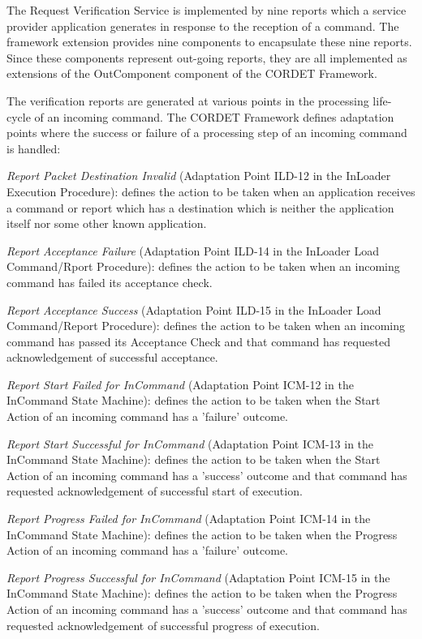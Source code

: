 \documentclass[a4paper,10pt]{article}
\newenvironment{fw_enumerate}					%
{\begin{enumerate}
  \setlength{\itemsep}{1mm}
  \setlength{\parskip}{0pt}
  \setlength{\parsep}{0pt}}
{\end{enumerate}}
\begin{document}
The Request Verification Service is implemented by nine reports which a service provider application generates in response to the reception of a command. The framework extension provides nine components to encapsulate these nine reports. Since these components represent out-going reports, they are all implemented as extensions of the OutComponent component of the CORDET Framework. 

The verification reports are generated at various points in the processing life-cycle of an incoming command. The CORDET Framework defines adaptation points where the success or failure of a processing step of an incoming command is handled: 

\begin{fw_enumerate}
\item \textit{Report Packet Destination Invalid} (Adaptation Point ILD-12 in the InLoader Execution Procedure): defines the action to be taken when an application receives a command or report which has a destination which is neither the application itself nor some other known application.
\item \textit{Report Acceptance Failure} (Adaptation Point ILD-14 in the InLoader Load Command/Rport Procedure): defines the action to be taken when an incoming command has failed its acceptance check.
\item \textit{Report Acceptance Success} (Adaptation Point ILD-15 in the InLoader Load Command/Report Procedure): defines the action to be taken when an incoming command has passed its Acceptance Check and that command has requested acknowledgement of successful acceptance.
\item \textit{Report Start Failed for InCommand} (Adaptation Point ICM-12 in the InCommand State Machine): defines the action to be taken when the Start Action of an incoming command has a 'failure' outcome.
\item \textit{Report Start Successful for InCommand} (Adaptation Point ICM-13 in the InCommand State Machine): defines the action to be taken when the Start Action of an incoming command has a 'success' outcome and that command has requested acknowledgement of successful start of execution.
\item \textit{Report Progress Failed for InCommand} (Adaptation Point ICM-14 in the InCommand State Machine): defines the action to be taken when the Progress Action of an incoming command has a 'failure' outcome.
\item \textit{Report Progress Successful for InCommand} (Adaptation Point ICM-15 in the InCommand State Machine): defines the action to be taken when the Progress Action of an incoming command has a 'success' outcome and that command has requested acknowledgement of successful progress of execution.

\end{fw_enumerate}
\end{document}
